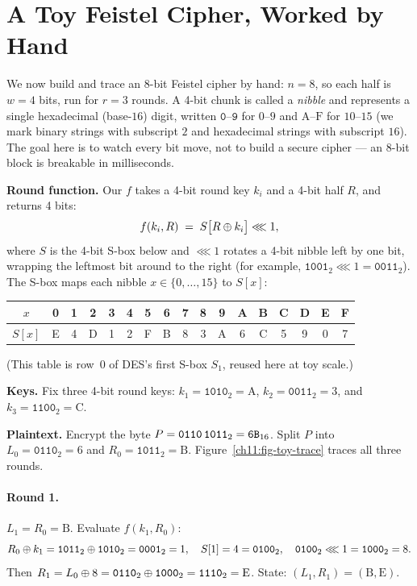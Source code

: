 \section{A Toy Feistel Cipher, Worked by Hand}
\label{ch11:toy}

We now build and trace an 8-bit Feistel cipher by hand: $n = 8$, so each half is $w = 4$ bits, run for $r = 3$ rounds. A 4-bit chunk is called a \emph{nibble} and represents a single hexadecimal (base-$16$) digit, written $\texttt{0}$--$\texttt{9}$ for $0$--$9$ and $\mathrm{A}$--$\mathrm{F}$ for $10$--$15$ (we mark binary strings with subscript $2$ and hexadecimal strings with subscript $16$). The goal here is to watch every bit move, not to build a secure cipher --- an 8-bit block is breakable in milliseconds.

\textbf{Round function.} Our $f$ takes a 4-bit round key $k_i$ and a 4-bit half $R$, and returns 4 bits:
\[
f(k_i, R) \;=\; S\bigl[R \oplus k_i\bigr] \lll 1,
\]
where $S$ is the 4-bit S-box below and $\lll 1$ rotates a 4-bit nibble left by one bit, wrapping the leftmost bit around to the right (for example, $\texttt{1001}_2 \lll 1 = \texttt{0011}_2$). The S-box maps each nibble $x \in \{0,\dots,15\}$ to $S[x]$:

\begin{center}
\begin{tabular}{c|cccccccccccccccc}
\toprule
$x$ & 0 & 1 & 2 & 3 & 4 & 5 & 6 & 7 & 8 & 9 & A & B & C & D & E & F\\
\midrule
$S[x]$ & E & 4 & D & 1 & 2 & F & B & 8 & 3 & A & 6 & C & 5 & 9 & 0 & 7\\
\bottomrule
\end{tabular}
\end{center}

(This table is row~0 of DES's first S-box $S_1$, reused here at toy scale.)

\textbf{Keys.} Fix three 4-bit round keys: $k_1 = \texttt{1010}_2 = \mathrm{A}$, $k_2 = \texttt{0011}_2 = 3$, and $k_3 = \texttt{1100}_2 = \mathrm{C}$.

\textbf{Plaintext.} Encrypt the byte $P = \texttt{0110\,1011}_2 = \texttt{6B}_{16}$. Split $P$ into $L_0 = \texttt{0110}_2 = 6$ and $R_0 = \texttt{1011}_2 = \mathrm{B}$. Figure~\ref{ch11:fig-toy-trace} traces all three rounds.

\paragraph{Round 1.} $L_1 = R_0 = \mathrm{B}$. Evaluate $f(k_1, R_0)$:
\[
R_0 \oplus k_1 = \texttt{1011}_2 \oplus \texttt{1010}_2 = \texttt{0001}_2 = 1,\quad
S[1] = 4 = \texttt{0100}_2,\quad
\texttt{0100}_2 \lll 1 = \texttt{1000}_2 = 8.
\]
Then $R_1 = L_0 \oplus 8 = \texttt{0110}_2 \oplus \texttt{1000}_2 = \texttt{1110}_2 = \mathrm{E}$. State: $(L_1,R_1) = (\mathrm{B},\mathrm{E})$.

